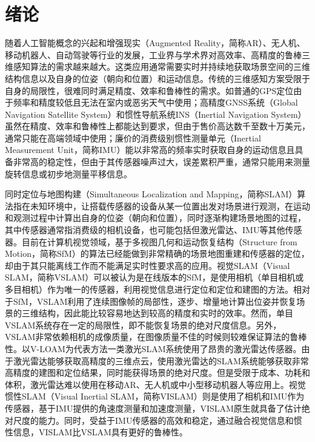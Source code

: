 \chapter{绪论}\label{ch:intro}

随着人工智能概念的兴起和增强现实（Augmented Reality，简称AR）、无人机、移动机器人、自动驾驶等行业的发展，工业界与学术界对高效率、高精度的鲁棒三维感知算法的需求越来越大。这类应用通常需要实时并持续地获取场景空间的三维结构信息以及自身的位姿（朝向和位置）和运动信息。传统的三维感知方案受限于自身的局限性，很难同时满足精度、效率和鲁棒性的需求。如普通的GPS定位由于频率和精度较低且无法在室内或恶劣天气中使用；高精度GNSS系统（Global Navigation Satellite System）和惯性导航系统INS（Inertial Navigation System）虽然在精度、效率和鲁棒性上都能达到要求，但由于售价高达数千至数十万美元，通常只能在高端领域中使用；廉价的消费级别惯性测量单元（Inertial Measurement Unit，简称IMU）能以非常高的频率实时获取自身的运动信息且具备非常高的稳定性，但由于其传感器噪声过大，误差累积严重，通常只能用来测量旋转信息或初步地测量平移信息。

同时定位与地图构建（Simultaneous Localization and Mapping，简称SLAM）算法指在未知环境中，让搭载传感器的设备从某一位置出发对场景进行观测，在运动和观测过程中计算出自身的位姿（朝向和位置），同时逐渐构建场景地图的过程，其中传感器通常指消费级的相机设备，也可能包括但激光雷达、IMU等其他传感器。目前在计算机视觉领域，基于多视图几何和运动恢复结构（Structure from Motion，简称SfM）的算法\citep{hartley2003multiple,ma2012invitation}已经能做到非常精确的场景地图重建和传感器的定位，却由于其只能离线工作而不能满足实时性要求高的应用。视觉SLAM（Visual SLAM，简称VSLAM）可以被认为是在线版本的SfM，是使用相机（单目相机或多目相机）作为唯一的传感器，利用视觉信息进行定位和定位和建图的方法。相对于SfM，VSLAM利用了连续图像帧的局部性，逐步、增量地计算出位姿并恢复场景的三维结构，因此能比较容易地达到较高的精度和实时的效率。然而，单目VSLAM系统存在一定的局限性，即不能恢复场景的绝对尺度信息。另外，VSLAM非常依赖相机的成像质量，在图像质量不佳的时候则较难保证算法的鲁棒性。以V-LOAM\citep{zhang2015visual}为代表方法一类激光SLAM系统使用了昂贵的激光雷达传感器。由于激光雷达能够获取高精度的三维点云，使用激光雷达的SLAM系统能够获取非常高精度的建图和定位结果，同时能获得场景的绝对尺度。但是受限于成本、功耗和体积，激光雷达难以使用在移动AR、无人机或中小型移动机器人等应用上。视觉惯性SLAM（Visual Inertial SLAM，简称VISLAM）则是使用了相机和IMU作为传感器，基于IMU提供的角速度测量和加速度测量，VISLAM原生就具备了估计绝对尺度的能力。同时，受益于IMU传感器的高效和稳定，通过融合视觉信息和惯性信息，VISLAM比VSLAM具有更好的鲁棒性。

